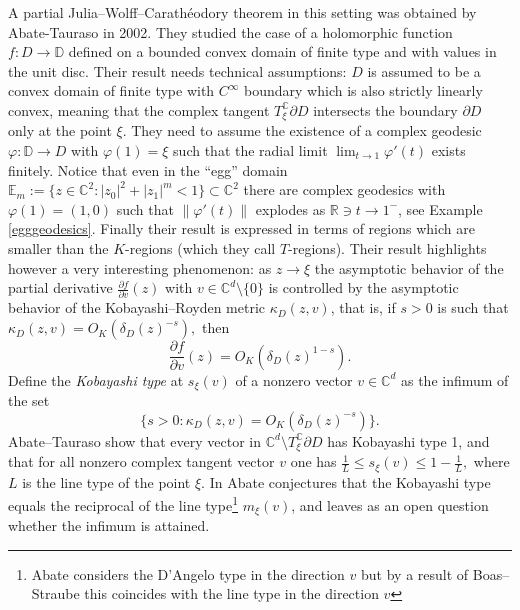 \documentclass[11pt, reqno]{amsart}
\numberwithin{equation}{section}
\theoremstyle{definition}
\newcommand{\C}{\mathbb{C}}
\newcommand{\D}{\mathbb{D}}
\newcommand{\R}{\mathbb{R}}
\begin{document}
	A partial Julia--Wolff--Carath\'eodory theorem  in this setting was obtained by Abate-Tauraso \cite{AbTau} in 2002. They  studied the case of a holomorphic function $f\colon D\to \D$ defined on a bounded convex domain of finite type and with values in the unit disc. Their result needs  technical assumptions:  $D$ is assumed to be a convex domain of finite type  with $C^\infty$ boundary which is also strictly linearly convex, meaning that the complex tangent $T_\xi^\C \partial D$ intersects the boundary $\partial D$ only at the point $\xi$.   They  need to assume the existence of a complex geodesic $\varphi\colon \D\to D$ with $\varphi(1)=\xi$ such that the radial limit $\lim_{t\to 1}\varphi'(t)$ exists finitely. Notice that even in the  ``egg'' domain $\mathbb{E}_m:=\{z\in\C^2:|z_0|^2+|z_1|^{m}<1\}\subset \C^2$  
	there are complex geodesics with $\varphi(1)=(1,0)$ such that  $\|\varphi'(t)\|$ explodes as $\R\ni t\to 1^-$, see Example \ref{egggeodesics}.
	Finally their result is expressed in terms of regions which are smaller than the $K$-regions (which they call $T$-regions).
	Their result highlights however a very interesting phenomenon: as $z\to \xi$ the asymptotic behavior of the partial derivative $\frac{\partial f}{\partial v}(z)$ with $v\in \C^d\setminus\{0\}$ is controlled by the asymptotic behavior of the Kobayashi--Royden metric $\kappa_D(z,v)$, that is, if $s>0$ is such that
	$\kappa_D(z,v)=O_K(\delta_D(z)^{-s}),$ then $$\frac{\partial f}{\partial v}(z)=O_K(\delta_D(z)^{1-s}).$$
	Define the {\sl Kobayashi type} at $s_\xi(v)$ of a nonzero vector $v\in \C^d$ as the infimum of the set
	$$\{s>0: \kappa_D(z,v)=O_K(\delta_D(z)^{-s})\}.$$
	Abate--Tauraso \cite{AbTau} show that every vector in $\C^d\setminus T^\C_\xi\partial D$ has Kobayashi  type 1,  and that for all nonzero complex tangent vector $v$ one has 
	$\frac{1}{L}\leq s_\xi(v)\leq 1-\frac{1}{L},$ where $L$ is the line type of the point $\xi$.
	In \cite{Absurv} Abate conjectures that  the Kobayashi type equals the reciprocal of the line type\footnote{Abate considers the D'Angelo type in the direction $v$ but by a result of Boas--Straube \cite{BS} this coincides with the line type in the direction $v$} $m_\xi(v)$, and leaves as an open question whether the infimum is attained.
	
\end{document}

